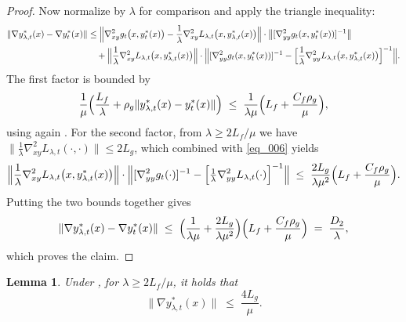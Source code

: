 \documentclass{uai2026} %
\newtheorem{lemma}{Lemma}[section]
\begin{document}
\begin{proof}
Now normalize  by $\lambda$ for comparison and apply the triangle inequality:
\begin{align*}
\|\nabla y^*_{\lambda,t}(x)-\nabla y^*_{t}(x)\|
&\le \Bigl\|\nabla^2_{xy}g_{t}\bigl(x,y^*_{t}(x)\bigr)-\frac{1}{\lambda}\nabla^2_{xy}L_{\lambda,t}\bigl(x,y^*_{\lambda,t}(x)\bigr)\Bigr\|
\cdot \bigl\|[\nabla^2_{yy}g_{t}(x,y^*_{t}(x))]^{-1}\bigr\|\\
&\quad + \Bigl\|\frac{1}{\lambda}\nabla^2_{xy}L_{\lambda,t}\bigl(x,y^*_{\lambda,t}(x)\bigr)\Bigr\|
\cdot \Bigl\|[\nabla^2_{yy}g_{t}(x,y^*_{t}(x))]^{-1}-\Bigl[\frac{1}{\lambda}\nabla^2_{yy}L_{\lambda,t}\bigl(x,y^*_{\lambda,t}(x)\bigr)\Bigr]^{-1}\Bigr\|.
\end{align*}
The first factor is bounded by
\[
\frac{1}{\mu}\Bigl(\frac{L_f}{\lambda} + \rho_g\|y^*_{\lambda,t}(x)-y^*_{t}(x)\|\Bigr)
\;\le\; \frac{1}{\lambda\mu}\Bigl(L_f + \frac{C_f\rho_g}{\mu}\Bigr),
\]
using again . For the second factor, from $\lambda \ge 2L_f/\mu$ we have
$\bigl\|\tfrac{1}{\lambda}\nabla^2_{xy}L_{\lambda,t}(\cdot,\cdot)\bigr\|\!\le\! 2L_g$, which combined with \eqref{eq_006}
yields
\[
\Bigl\|\frac{1}{\lambda}\nabla^2_{xy}L_{\lambda,t}\bigl(x,y^*_{\lambda,t}(x)\bigr)\Bigr\|
\cdot
\Bigl\|[\nabla^2_{yy}g_{t}(\cdot)]^{-1}-\Bigl[\tfrac{1}{\lambda}\nabla^2_{yy}L_{\lambda,t}(\cdot)\Bigr]^{-1}\Bigr\|
\;\le\; \frac{2L_g}{\lambda\mu^2}\Bigl(L_f + \frac{C_f\rho_g}{\mu}\Bigr).
\]
Putting the two bounds together gives
\[
\|\nabla y^*_{\lambda,t}(x)-\nabla y^*_{t}(x)\|
\;\le\; \Bigl(\frac{1}{\lambda\mu} + \frac{2L_g}{\lambda\mu^2}\Bigr)\Bigl(L_f + \frac{C_f\rho_g}{\mu}\Bigr)
\;=\; \frac{D_2}{\lambda},
\]
which proves the claim.
\end{proof}
\begin{lemma}
\label{lem:B6}
Under , for $\lambda \ge 2L_f/\mu$, it holds that
\[
\bigl\|\nabla y^*_{\lambda,t}(x)\bigr\| \;\le\; \frac{4L_g}{\mu}.
\]
\end{lemma}
\end{document}
